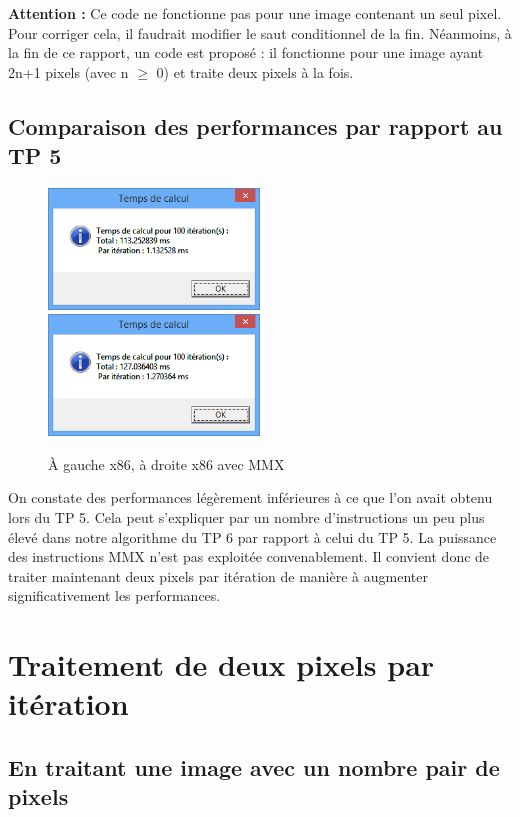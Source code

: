 \bigskip

\textbf{Attention :} Ce code ne fonctionne pas pour une image contenant un seul pixel. Pour corriger cela, il faudrait modifier le saut conditionnel de la fin. Néanmoins, à la fin de ce rapport, un code est proposé : il fonctionne pour une image ayant 2n+1 pixels (avec n $\geq$ 0) et traite deux pixels à la fois.


\section{Comparaison des performances par rapport au TP 5}

\begin{figure}[!h]
   \includegraphics[width=0.5\textwidth]{screens/assembly.png}
   \includegraphics[width=0.5\textwidth]{screens/mmx_1px.png}
   \caption{À gauche x86, à droite x86 avec MMX}
\end{figure}

On constate des performances légèrement inférieures à ce que l'on avait obtenu lors du TP 5. Cela peut s'expliquer par un nombre d'instructions un peu plus élevé dans notre algorithme du TP 6 par rapport à celui du TP 5. La puissance des instructions MMX n'est pas exploitée convenablement. Il convient donc de traiter maintenant deux pixels par itération de manière à augmenter significativement les performances.

\chapter{Traitement de deux pixels par itération}
\label{deuxpixels}
\section{En traitant une image avec un nombre pair de pixels}
